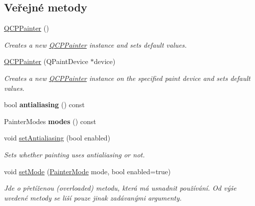 \subsection*{Veřejné metody}
\begin{DoxyCompactItemize}
\item 
\hypertarget{classQCPPainter_a3c52cb0f43f34573d29bea487da28fe8}{}\hyperlink{classQCPPainter_a3c52cb0f43f34573d29bea487da28fe8}{Q\+C\+P\+Painter} ()\label{classQCPPainter_a3c52cb0f43f34573d29bea487da28fe8}

\begin{DoxyCompactList}\small\item\em Creates a new \hyperlink{classQCPPainter}{Q\+C\+P\+Painter} instance and sets default values. \end{DoxyCompactList}\item 
\hyperlink{classQCPPainter_ae58dbb1795ddc4351ab324dc9898aa22}{Q\+C\+P\+Painter} (Q\+Paint\+Device $\ast$device)
\begin{DoxyCompactList}\small\item\em Creates a new \hyperlink{classQCPPainter}{Q\+C\+P\+Painter} instance on the specified paint {\itshape device} and sets default values. \end{DoxyCompactList}\item 
\hypertarget{classQCPPainter_a13370d7996315a7150be2fc868da3d4a}{}bool {\bfseries antialiasing} () const \label{classQCPPainter_a13370d7996315a7150be2fc868da3d4a}

\item 
\hypertarget{classQCPPainter_a99b89eaf5363faaa1e1e6162856f436c}{}Painter\+Modes {\bfseries modes} () const \label{classQCPPainter_a99b89eaf5363faaa1e1e6162856f436c}

\item 
void \hyperlink{classQCPPainter_aaba1deb9188244d9ea65b035112b4d05}{set\+Antialiasing} (bool enabled)
\begin{DoxyCompactList}\small\item\em Sets whether painting uses antialiasing or not. \end{DoxyCompactList}\item 
void \hyperlink{classQCPPainter_af6b1f7d2bbc548b10aa55d8b6ad49577}{set\+Mode} (\hyperlink{classQCPPainter_a156cf16444ff5e0d81a73c615fdb156d}{Painter\+Mode} mode, bool enabled=true)
\begin{DoxyCompactList}\small\item\em Jde o přetíženou (overloaded) metodu, která má usnadnit používání. Od výše uvedené metody se liší pouze jinak zadávanými argumenty.


\end{DoxyCompactList}
\end{DoxyCompactItemize}

